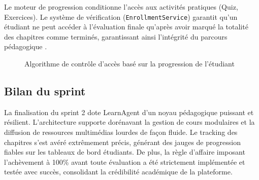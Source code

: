 \documentclass[12pt,a4paper]{report}
\begin{document}
Le moteur de progression conditionne l'accès aux activités pratiques (Quiz, Exercices). Le système de vérification (\texttt{EnrollmentService}) garantit qu'un étudiant ne peut accéder à l'évaluation finale qu'après avoir marqué la totalité des chapitres comme terminés, garantissant ainsi l'intégrité du parcours pédagogique \cite{fowler_uml}.

\begin{figure}[H]
\centering
{}
\caption{Algorithme de contrôle d’accès basé sur la progression de l'étudiant}
\end{figure}

\subsection{Bilan du sprint}

La finalisation du sprint 2 dote LearnAgent d'un noyau pédagogique puissant et résilient. L'architecture supporte dorénavant la gestion de cours modulaires et la diffusion de ressources multimédias lourdes de façon fluide. Le tracking des chapitres s'est avéré extrêmement précis, générant des jauges de progression fiables sur les tableaux de bord étudiants. De plus, la règle d'affaire imposant l'achèvement à 100\% avant toute évaluation a été strictement implémentée et testée avec succès, consolidant la crédibilité académique de la plateforme.
\end{document}
